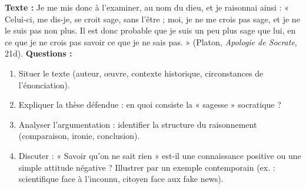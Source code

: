 \documentclass[11pt]{article}
\begin{document}
\begin{exercice}
\textbf{Texte :} \og Je me mis donc à l'examiner, au nom du dieu, et je raisonnai ainsi : « Celui-ci, me dis-je, se croit sage, sans l'être ; moi, je ne me crois pas sage, et je ne le suis pas non plus. Il est donc probable que je suis un peu plus sage que lui, en ce que je ne crois pas savoir ce que je ne sais pas. » \fg{} (Platon, \emph{Apologie de Socrate}, 21d).
\textbf{Questions :}
\begin{enumerate}
    \item Situer le texte (auteur, œuvre, contexte historique, circonstances de l'énonciation).
    \item Expliquer la thèse défendue : en quoi consiste la « sagesse » socratique ?
    \item Analyser l'argumentation : identifier la structure du raisonnement (comparaison, ironie, conclusion).
    \item Discuter : « Savoir qu'on ne sait rien » est-il une connaissance positive ou une simple attitude négative ? Illustrer par un exemple contemporain (ex. : scientifique face à l'inconnu, citoyen face aux fake news).
\end{enumerate}
\end{exercice}
\end{document}
